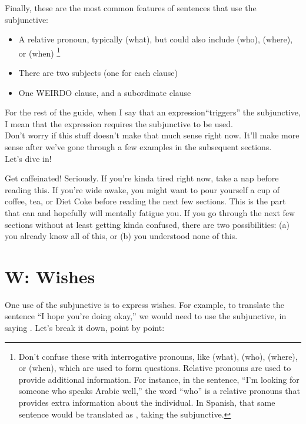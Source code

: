 Finally, these are the most common features of sentences that use the subjunctive:
\begin{itemize}[noitemsep]
	\item A relative pronoun, typically  (what), but could also include  (who),  (where), or  (when) \footnote{Don't confuse these with interrogative pronouns, like  (what),  (who),  (where), or  (when), which are used to form questions. Relative pronouns are used to provide additional information. For instance, in the sentence, ``I'm looking for someone who speaks Arabic well,'' the word ``who'' is a relative pronouns that provides extra information about the individual. In Spanish, that same sentence would be translated as , taking the subjunctive. }
	\item There are two subjects (one for each clause)
	\item One WEIRDO clause, and a subordinate clause
\end{itemize}

For the rest of the guide, when I say that an expression``triggers'' the subjunctive, I mean that the expression requires the subjunctive to be used. \\

Don't worry if this stuff doesn't make that much sense right now. It'll make more sense after we've gone through a few examples in the subsequent sections. \\

Let's dive in! 

\begin{conf}{Get caffeinated!}
Seriously. If you're kinda tired right now, take a nap before reading this. If you're wide awake, you might want to pour yourself a cup of coffee, tea, or Diet Coke before reading the next few sections. This is the part that can and hopefully will mentally fatigue you. If you go through the next few sections without at least getting kinda confused, there are two possibilities: (a) you already know all of this, or (b) you understood none of this. 
\end{conf}
\section{W: Wishes}

One use of the subjunctive is to express wishes. For example, to translate the sentence ``I hope you're doing okay,'' we would need to use the subjunctive, in saying . Let's break it down, point by point:

